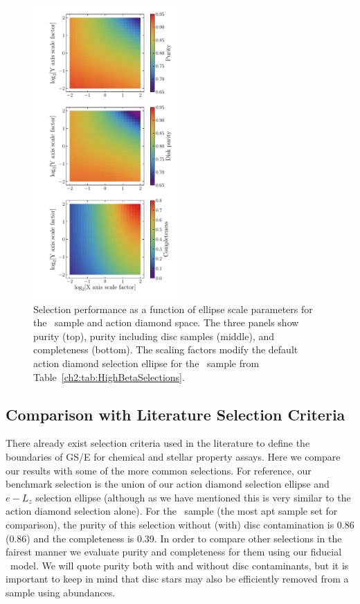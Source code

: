 \begin{figure}
    \centering
    \includegraphics[width=0.5\textwidth]{figure/ch2/SurveyADCompletenessPurity.pdf}
    \caption{Selection performance as a function of ellipse scale parameters for the \survey\ sample and action diamond space. The three panels show purity (top), purity including disc samples (middle), and completeness (bottom). The scaling factors modify the default action diamond selection ellipse for the \survey\ sample from Table~\ref{ch2:tab:HighBetaSelections}.}
    \label{ch2:fig:SurveyADCompletenessPurity}
\end{figure}


\subsection{Comparison with Literature Selection Criteria}

There already exist selection criteria used in the literature to define the boundaries of GS/E for chemical and stellar property assays. Here we compare our results with some of the more common selections. For reference, our benchmark selection is the union of our action diamond selection ellipse and $e-L_{z}$ selection ellipse (although as we have mentioned this is very similar to the action diamond selection alone). For the \survey\ sample (the most apt sample set for comparison), the purity of this selection without (with) disc contamination is 0.86 (0.86) and the completeness is 0.39. In order to compare other selections in the fairest manner we evaluate purity and completeness for them using our fiducial \survey\ model. We will quote purity both with and without disc contaminants, but it is important to keep in mind that disc stars may also be efficiently removed from a sample using abundances.

